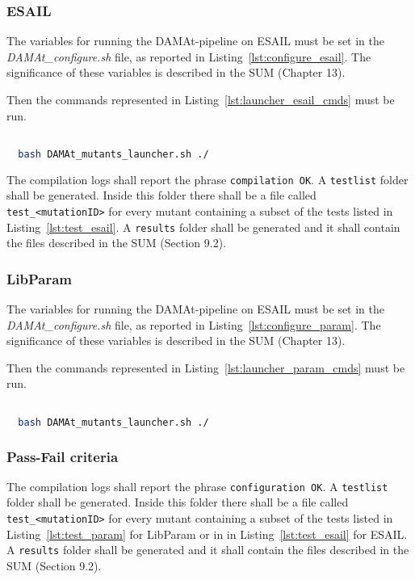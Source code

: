 \subsubsection{ESAIL}

The variables for running the DAMAt-pipeline on ESAIL must be set in the \emph{DAMAt\_configure.sh} file, as reported in Listing~\ref{lst:configure_esail}. The significance of these variables is described in the SUM (Chapter 13).

Then the commands represented in Listing~\ref{lst:launcher_esail_cmds} must be run.

  \begin{lstlisting}[language=bash, label={lst:launcher_esail_cmds}]

  bash DAMAt_mutants_launcher.sh ./

  \end{lstlisting}

  The compilation logs shall report the phrase \texttt{compilation OK}.
  A \texttt{testlist} folder shall be generated. Inside this folder there shall be a file called \texttt{test\_<mutationID>} for every mutant containing a subset of the tests listed in Listing~\ref{lst:test_esail}.
  A \texttt{results} folder shall be generated and it shall contain the files described in the SUM (Section 9.2).

\subsubsection{LibParam}

The variables for running the DAMAt-pipeline on ESAIL must be set in the \emph{DAMAt\_configure.sh} file, as reported in Listing~\ref{lst:configure_param}. The significance of these variables is described in the SUM (Chapter 13).

Then the commands represented in Listing~\ref{lst:launcher_param_cmds} must be run.

  \begin{lstlisting}[language=bash, label={lst:launcher_param_cmds}]

  bash DAMAt_mutants_launcher.sh ./

  \end{lstlisting}

\subsubsection{Pass-Fail criteria}

The compilation logs shall report the phrase \texttt{configuration OK}.
A \texttt{testlist} folder shall be generated. Inside this folder there shall be a file called \texttt{test\_<mutationID>} for every mutant containing a subset of the tests listed in Listing~\ref{lst:test_param} for LibParam or in in Listing~\ref{lst:test_esail} for ESAIL.
A \texttt{results} folder shall be generated and it shall contain the files described in the SUM (Section 9.2).

